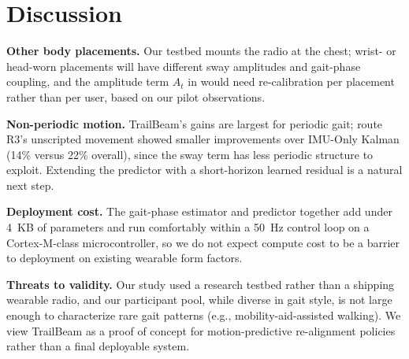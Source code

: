 \section{Discussion}
\textbf{Other body placements.} Our testbed mounts the radio at the chest; wrist- or head-worn placements will have different sway amplitudes and gait-phase coupling, and the amplitude term $A_t$ in  would need re-calibration per placement rather than per user, based on our pilot observations.

\textbf{Non-periodic motion.} TrailBeam's gains are largest for periodic gait; route R3's unscripted movement showed smaller improvements over IMU-Only Kalman (14\% versus 22\% overall), since the sway term has less periodic structure to exploit. Extending the predictor with a short-horizon learned residual is a natural next step.

\textbf{Deployment cost.} The gait-phase estimator and predictor together add under 4~KB of parameters and run comfortably within a 50~Hz control loop on a Cortex-M-class microcontroller, so we do not expect compute cost to be a barrier to deployment on existing wearable form factors.

\textbf{Threats to validity.} Our study used a research testbed rather than a shipping wearable radio, and our participant pool, while diverse in gait style, is not large enough to characterize rare gait patterns (e.g., mobility-aid-assisted walking). We view TrailBeam as a proof of concept for motion-predictive re-alignment policies rather than a final deployable system.
